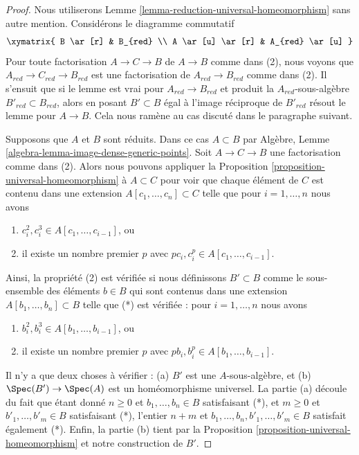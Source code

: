 \begin{proof}
Nous utiliserons Lemme \ref{lemma-reduction-universal-homeomorphism} sans autre mention.
Considérons le diagramme commutatif
$$
\xymatrix{
B \ar[r] & B_{red} \\
A \ar[u] \ar[r] & A_{red} \ar[u]
}
$$
Pour toute factorisation $A \to C \to B$ de $A \to B$ comme dans (2),
nous voyons que $A_{red} \to C_{red} \to B_{red}$ est une factorisation de
$A_{red} \to B_{red}$ comme dans (2). Il s'ensuit que si le lemme
est vrai pour $A_{red} \to B_{red}$ et produit la $A_{red}$-sous-algèbre $B'_{red} \subset B_{red}$,
alors en posant $B' \subset B$ égal à l'image
réciproque de $B'_{red}$ résout le lemme pour $A \to B$.
Cela nous ramène au cas discuté dans le paragraphe suivant.

\medskip\noindent
Supposons que $A$ et $B$ sont réduits.
Dans ce cas $A \subset B$ par Algèbre, Lemme \ref{algebra-lemma-image-dense-generic-points}.
Soit $A \to C \to B$ une factorisation comme dans
(2). Alors nous pouvons appliquer la Proposition \ref{proposition-universal-homeomorphism} à $A \subset C$
pour voir que chaque élément de $C$ est
contenu dans une extension $A[c_1, \ldots, c_n] \subset C$ telle que pour
$i = 1, \ldots, n$ nous avons
\begin{enumerate}
\item $c_i^2, c_i^3 \in A[c_1, \ldots, c_{i - 1}]$, ou
\item il existe un nombre premier
$p$ avec $pc_i, c_i^p \in A[c_1, \ldots, c_{i - 1}]$.
\end{enumerate}
Ainsi, la propriété (2) est vérifiée si nous définissons $B' \subset B$
comme le sous-ensemble des éléments $b \in B$ qui sont contenus dans
une extension $
A[b_1, \ldots, b_n] \subset B
$ telle
que (*) est vérifiée : pour $i = 1, \ldots, n$ nous avons
\begin{enumerate}
\item $b_i^2, b_i^3 \in A[b_1, \ldots, b_{i - 1}]$, ou
\item il existe un nombre premier
$p$ avec $pb_i, b_i^p \in A[b_1, \ldots, b_{i - 1}]$.
\end{enumerate}
Il n'y a que deux choses à vérifier : (a) $B'$ est une $A$-sous-algèbre,
et (b) $\Spec(B') \to \Spec(A)$ est un homéomorphisme
universel. La partie (a) découle du fait que étant donné
$n \geq 0$ et $b_1, \ldots, b_n \in B$ satisfaisant (*), et $m \geq 0$
et $b'_1, \ldots, b'_m \in B$ satisfaisant
(*), l'entier $n + m$ et $b_1, \ldots, b_n, b'_1, \ldots, b'_m \in B$ satisfait
également (*). Enfin, la partie (b)
tient par la Proposition \ref{proposition-universal-homeomorphism} et notre construction de
$B'$.
\end{proof}

